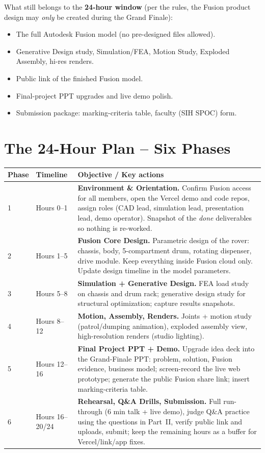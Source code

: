 \documentclass[11pt, a4paper]{article}
\begin{document}
What still belongs to the \textbf{24-hour window} (per the rules, the Fusion
product design may \emph{only} be created during the Grand Finale):
\begin{itemize}[leftmargin=1.6em, itemsep=2pt]
  \item The full Autodesk Fusion model (no pre-designed files allowed).
  \item Generative Design study, Simulation/FEA, Motion Study, Exploded
        Assembly, hi-res renders.
  \item Public link of the finished Fusion model.
  \item Final-project PPT upgrades and live demo polish.
  \item Submission package: marking-criteria table, faculty (SIH SPOC) form.
\end{itemize}

\section{The 24-Hour Plan -- Six Phases}

\begin{tabularx}{\textwidth}{llX}
  \toprule
  \textbf{Phase} & \textbf{Timeline} & \textbf{Objective / Key actions}\\
  \midrule
  1 & Hours 0--1 & \textbf{Environment \& Orientation.} Confirm Fusion access for
    all members, open the Vercel demo and code repos, assign roles (CAD lead,
    simulation lead, presentation lead, demo operator). Snapshot of the
    \emph{done} deliverables so nothing is re-worked.\\
  \midrule
  2 & Hours 1--5 & \textbf{Fusion Core Design.} Parametric design of the rover:
    chassis, body, 5-compartment drum, rotating dispenser, drive module.
    Keep everything inside Fusion cloud only. Update design timeline in the
    model parameters.\\
  \midrule
  3 & Hours 5--8 & \textbf{Simulation + Generative Design.} FEA load study on
    chassis and drum rack; generative design study for structural
    optimization; capture results snapshots.\\
  \midrule
  4 & Hours 8--12 & \textbf{Motion, Assembly, Renders.} Joints + motion study
    (patrol/dumping animation), exploded assembly view, high-resolution
    renders (studio lighting).\\
  \midrule
  5 & Hours 12--16 & \textbf{Final Project PPT + Demo.} Upgrade idea deck into
    the Grand-Finale PPT: problem, solution, Fusion evidence, business model;
    screen-record the live web prototype; generate the public Fusion share
    link; insert marking-criteria table.\\
  \midrule
  6 & Hours 16--20/24 & \textbf{Rehearsal, Q\&A Drills, Submission.} Full
    run-through (6 min talk + live demo), judge Q\&A practice using the
    questions in Part~II, verify public link and uploads, submit; keep the
    remaining hours as a buffer for Vercel/link/app fixes.\\
  \bottomrule
\end{tabularx}
\end{document}

